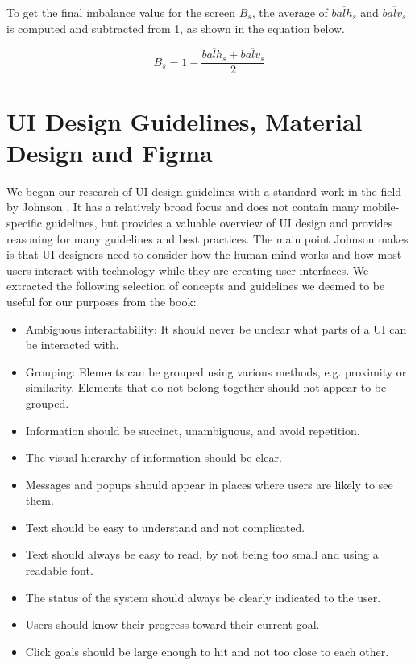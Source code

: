 \documentclass[11pt,titlepage,oneside,openany]{book}
\begin{document}
To get the final imbalance value for the screen $B_s$, the average of $\overline{balh_s}$ and $\overline{balv_s}$ is computed and subtracted from 1, as shown in the equation below.

\begin{equation}
	B_s = 1 - \frac{\overline{balh_s} + \overline{balv_s}}{2}
\end{equation}

\section{UI Design Guidelines, Material Design and Figma}\label{sec:guidelines}

We began our research of UI design guidelines with a standard work in the field by Johnson \cite{johnson_designing_2020}. It has a relatively broad focus and does not contain many mobile-specific guidelines, but provides a valuable overview of UI design and provides reasoning for many guidelines and best practices. The main point Johnson makes is that UI designers need to consider how the human mind works and how most users interact with technology while they are creating user interfaces. We extracted the following selection of concepts and guidelines we deemed to be useful for our purposes from the book:
\begin{itemize}
	\item Ambiguous interactability: It should never be unclear what parts of a UI can be interacted with.
	\item Grouping: Elements can be grouped using various methods, e.g. proximity or similarity. Elements that do not belong together should not appear to be grouped.
	\item Information should be succinct, unambiguous, and avoid repetition.
	\item The visual hierarchy of information should be clear.
	\item Messages and popups should appear in places where users are likely to see them.
	\item Text should be easy to understand and not complicated.
	\item Text should always be easy to read, by not being too small and using a readable font.
	\item The status of the system should always be clearly indicated to the user.
	\item Users should know their progress toward their current goal.
	\item Click goals should be large enough to hit and not too close to each other.
\end{itemize}
\end{document}
